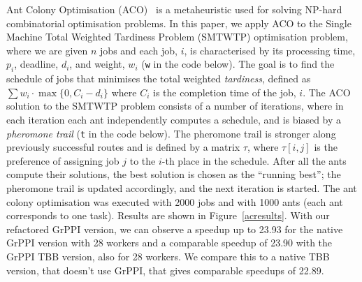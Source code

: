 Ant Colony Optimisation (ACO)~\cite{Dorigo-aco-book} is a metaheuristic used 
for solving NP-hard combinatorial
optimisation problems. %
In this paper, we apply ACO to the 
Single Machine Total Weighted Tardiness Problem (SMTWTP) optimisation
problem, where we are given $n$ jobs
and each job, $i$, is characterised by its processing time, $p_i$,
deadline, $d_i$,  and weight,
$w_i$ (\lstinline{w} in the code below).%
The goal is to find the schedule
of jobs that minimises the total weighted
\emph{tardiness}, defined as $\sum w_i \cdot \max \{0, C_i-d_i\}$ 
where $C_i$ is the
completion time of the job, $i$.
The ACO solution to the SMTWTP problem consists of a number of
iterations, where in each iteration each ant
independently computes a schedule, and is biased by
a \emph{pheromone trail} (\lstinline{t} in the code below). 
The pheromone trail is stronger along previously successful routes and 
is defined by a matrix $\tau$, where $\tau[i,j]$ is the preference of assigning 
job $j$ to the $i$-th place in the schedule. 
After all the ants compute their solutions, the best solution is chosen as
the ``running best''; the pheromone trail is updated accordingly, and
the next iteration is started.
The ant colony optimisation was executed with 2000 jobs and
with 1000 ants (each ant corresponds to one task).
Results are shown in Figure~\ref{acresults}.
With our refactored GrPPI version, we can observe a speedup up to 23.93 for the native GrPPI version with 28 workers and a comparable speedup of 23.90
with the GrPPI TBB version, also for 28 workers. We compare this to a native TBB version, that doesn't use GrPPI, that gives comparable speedups of 22.89. 


